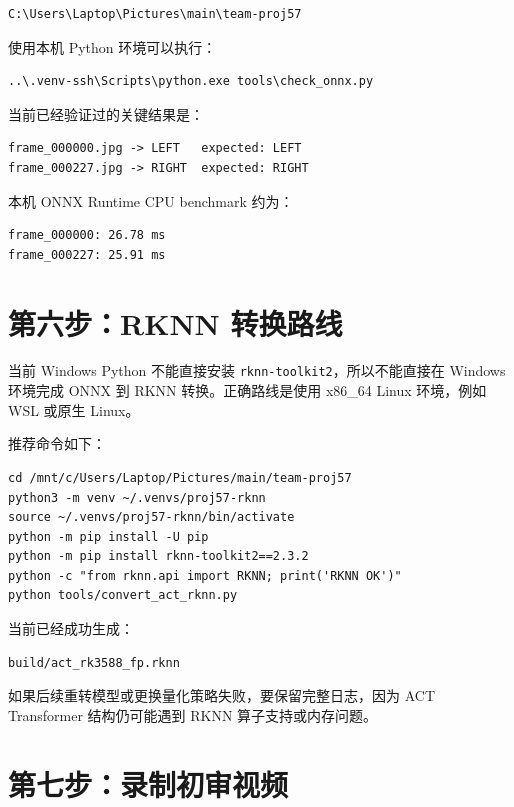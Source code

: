 \documentclass[UTF8,a4paper,11pt]{ctexart}
\begin{document}
\begin{verbatim}
C:\Users\Laptop\Pictures\main\team-proj57
\end{verbatim}

使用本机 Python 环境可以执行：

\begin{verbatim}
..\.venv-ssh\Scripts\python.exe tools\check_onnx.py
\end{verbatim}

当前已经验证过的关键结果是：

\begin{verbatim}
frame_000000.jpg -> LEFT   expected: LEFT
frame_000227.jpg -> RIGHT  expected: RIGHT
\end{verbatim}

本机 ONNX Runtime CPU benchmark 约为：

\begin{verbatim}
frame_000000: 26.78 ms
frame_000227: 25.91 ms
\end{verbatim}

\section{第六步：RKNN 转换路线}

当前 Windows Python 不能直接安装 \verb|rknn-toolkit2|，所以不能直接在 Windows 环境完成 ONNX 到 RKNN 转换。正确路线是使用 x86\_64 Linux 环境，例如 WSL 或原生 Linux。

推荐命令如下：

\begin{verbatim}
cd /mnt/c/Users/Laptop/Pictures/main/team-proj57
python3 -m venv ~/.venvs/proj57-rknn
source ~/.venvs/proj57-rknn/bin/activate
python -m pip install -U pip
python -m pip install rknn-toolkit2==2.3.2
python -c "from rknn.api import RKNN; print('RKNN OK')"
python tools/convert_act_rknn.py
\end{verbatim}

当前已经成功生成：

\begin{verbatim}
build/act_rk3588_fp.rknn
\end{verbatim}

如果后续重转模型或更换量化策略失败，要保留完整日志，因为 ACT Transformer 结构仍可能遇到 RKNN 算子支持或内存问题。

\section{第七步：录制初审视频}
\end{document}
